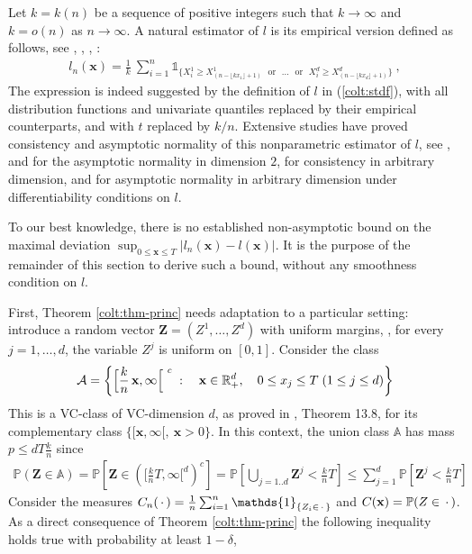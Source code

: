 Let $k=k(n)$ be a sequence of positive integers such that $k \to
\infty$ and $k=o(n)$ as $n \to \infty$.
A natural estimator of $l$ is its empirical version defined as
follows,  see \cite{Huangphd}, \cite{Qi97}, \cite{Drees98}, \cite{Einmahl2006}:
\begin{align}
\label{colt:ln}
l_n(\mathbf{x})=\frac{1}{k}~\sum_{i=1}^{n} \mathds{1}_{\{X_i^1 \ge X^1_{(n-\lfloor kx_1 \rfloor+1)} \text{~~or~~} \ldots \text{~~or~~} X_i^d \ge X^d_{(n-\lfloor kx_d\rfloor+1)} \}}~,
\end{align}
\noindent
 The expression is indeed suggested by the definition of $l$ in
 (\ref{colt:stdf}), with all distribution functions and  univariate
 quantiles replaced by their empirical counterparts, and with $t$
 replaced by $k/n$. Extensive studies have proved consistency and 
 asymptotic normality of this nonparametric estimator of $l$, see \cite{Huangphd}, \cite{Drees98} and \cite{dHF06} for the asymptotic normality in dimension $2$, \cite{Qi97} for consistency in arbitrary dimension, and \cite{Einmahl2012} for asymptotic normality in arbitrary dimension under differentiability conditions on $l$.

To our best knowledge, there is no established non-asymptotic bound on the maximal deviation $\sup_{0 \le \mathbf{x} \le T} \left| l_n(\mathbf{x}) - l(\mathbf{x}) \right|$. It is the purpose of the remainder of this section to derive such a bound, without any smoothness condition on $l$.

First, Theorem \ref{colt:thm-princ} needs adaptation  to a   particular
setting: introduce  a random vector 
$\mathbf{Z}=(Z^1,\ldots,Z^d)$ with uniform margins, \ie, for every
$j=1,\ldots,d$, the variable $Z^j$ is uniform on $[0,1]$.  Consider
the class 
\[
\mathcal{A} = \left\{ \Big[  \frac{k}{n}\,
  \mathbf{x},\infty\Big[^{~c} \;:\quad \mathbf x \in \mathbb{R}^d_+ , \quad 0 \le x_j
\le T \; (1\le j\le d) \right\}
\]
This is a VC-class of
VC-dimension $d$,  as proved in \cite{Devroye96}, Theorem 13.8, for
its complementary class  $\big\{[\mathbf{x},\infty[ ,~ \mathbf{x}>0
\big\}$. %
In this context, the union class $\mathbb{A}$ has mass $p \le dT\frac{k}{n}$ since 
\begin{align*}
\mathbb{P}(\mathbf{Z} \in \mathbb{A}) = \mathbb{P} \left[ \mathbf{Z} \in \left(\Big[\frac{k}{n}T,\infty\Big[^d\right)^c\right] = \mathbb{P} \left[ \bigcup_{j=1..d} \mathbf{Z}^j < \frac{k}{n}T \right] \le \sum_{j=1}^d \mathbb{P} \left[ \mathbf{Z}^j < \frac{k}{n}T \right]
\end{align*}
\noindent
Consider the measures $C_n(\point)=\frac{1}{n} \sum_{i=1}^{n}
\mathds{1}_{\{Z_i \in \point \}}$ and $C(\mathbf{x})=\mathbb{P}(Z \in
\,\cdot\,)$. As a direct consequence of Theorem \ref{colt:thm-princ} the
following inequality holds true  with probability at least $1-\delta$,

